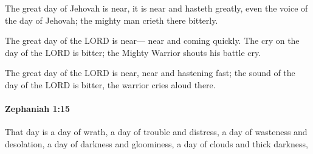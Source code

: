 			\begin{versebox}
					\item[BHS] 
					\item[LXX] 
					\item[ASV] The great day of Jehovah is near, it is near and hasteth greatly, even the voice of the day of Jehovah; the mighty man crieth there bitterly.
					\item[NIV] The great day of the LORD is near— near and coming quickly. The cry on the day of the LORD is bitter; the Mighty Warrior shouts his battle cry.
					\item[NRSV] The great day of the LORD is near, near and hastening fast; the sound of the day of the LORD is bitter, the warrior cries aloud there.
			\end{versebox}

		\paragraph{Zephaniah 1:15} %
			\label{ZEPHANIAH-1-15}

			That day is a day of wrath, a day of trouble and distress, a day of wasteness and desolation, a day of darkness and gloominess, a day of clouds and thick darkness,

